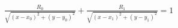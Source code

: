 \documentclass[preview]{standalone}
\begin{document}
\begin{align*}
\frac{R_0}{\sqrt{(x - x_0) ^ 2 + (y - y_0) ^ 2}} + \frac{R_1}{\sqrt{(x - x_1) ^ 2 + (y - y_1) ^ 2}} = 1
\end{align*}
\end{document}
